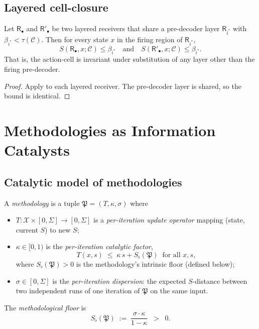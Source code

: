 \documentclass[twocolumn,11pt,a4paper]{article}
\newcommand{\X}{\mathcal{X}}
\newcommand{\Cell}{\mathcal{C}}
\newcommand{\Method}{\mathfrak{P}}
\newcommand{\receiver}{\mathsf{R}}
\newcommand{\Sfloor}{S_{\flat}}
\begin{document}
\subsection{Layered cell-closure}

\begin{theorem}\label{thm:cell-closure}
Let $\receiver_\bullet$ and $\receiver'_\bullet$ be two layered receivers
that share a pre-decoder layer $\receiver_{i^*}$ with
$\beta_{i^*}<\tau(\Cell)$. Then for every state $x$ in the firing region
of $\receiver_{i^*}$,
\[
S(\receiver_\bullet,x;\Cell)\le\beta_{i^*}\quad\text{and}\quad
S(\receiver'_\bullet,x;\Cell)\le\beta_{i^*}.
\]
That is, the action-cell is invariant under substitution of any layer
other than the firing pre-decoder.
\end{theorem}

\begin{proof}
Apply  to each layered receiver. The pre-decoder
layer is shared, so the bound is identical.
\end{proof}

\section{Methodologies as Information Catalysts}
\label{sec:methodology}

\subsection{Catalytic model of methodologies}

\begin{definition}[Methodology]\label{def:method}
A \emph{methodology} is a tuple $\Method=(T,\kappa,\sigma)$ where
\begin{itemize}[leftmargin=*]
\item $T:\X\times[0,\Sigma]\to[0,\Sigma]$ is a \emph{per-iteration update
operator} mapping (state, current $S$) to new $S$;
\item $\kappa\in[0,1)$ is the \emph{per-iteration catalytic factor},
\[
T(x,s)\;\le\;\kappa\,s+\Sfloor(\Method)\;\;\text{for all }x,s,
\]
where $\Sfloor(\Method)>0$ is the methodology's intrinsic floor (defined
below);
\item $\sigma\in[0,\Sigma]$ is the \emph{per-iteration dispersion}: the
expected $S$-distance between two independent runs of one iteration of
$\Method$ on the same input.
\end{itemize}
The \emph{methodological floor} is
\[
\Sfloor(\Method)\;:=\;\frac{\sigma\cdot\kappa}{1-\kappa}\;\;>\;\;0.
\]
\end{definition}
\end{document}
